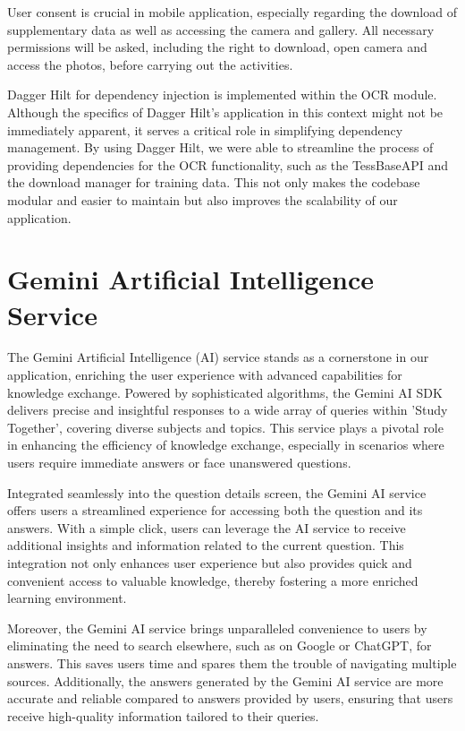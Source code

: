 User consent is crucial in mobile application, especially regarding the download of supplementary data as well as accessing the camera and gallery. All necessary permissions will be asked, including the right to download, open camera and access the photos, before carrying out the activities.

Dagger Hilt for dependency injection is implemented within the OCR module. Although the specifics of Dagger Hilt's application in this context might not be immediately apparent, it serves a critical role in simplifying dependency management. By using Dagger Hilt, we were able to streamline the process of providing dependencies for the OCR functionality, such as the TessBaseAPI and the download manager for training data. This not only makes the codebase modular and easier to maintain but also improves the scalability of our application.

\section{Gemini Artificial Intelligence Service}

The Gemini Artificial Intelligence (AI) service stands as a cornerstone in our application, enriching the user experience with advanced capabilities for knowledge exchange. Powered by sophisticated algorithms, the Gemini AI SDK delivers precise and insightful responses to a wide array of queries within 'Study Together', covering diverse subjects and topics. This service plays a pivotal role in enhancing the efficiency of knowledge exchange, especially in scenarios where users require immediate answers or face unanswered questions.

Integrated seamlessly into the question details screen, the Gemini AI service offers users a streamlined experience for accessing both the question and its answers. With a simple click, users can leverage the AI service to receive additional insights and information related to the current question. This integration not only enhances user experience but also provides quick and convenient access to valuable knowledge, thereby fostering a more enriched learning environment.

Moreover, the Gemini AI service brings unparalleled convenience to users by eliminating the need to search elsewhere, such as on Google or ChatGPT, for answers. This saves users time and spares them the trouble of navigating multiple sources. Additionally, the answers generated by the Gemini AI service are more accurate and reliable compared to answers provided by users, ensuring that users receive high-quality information tailored to their queries.

